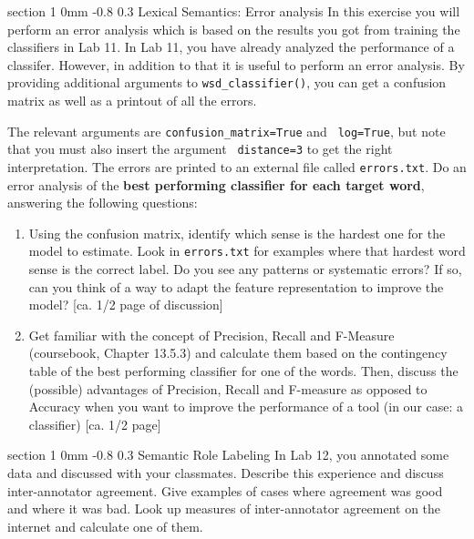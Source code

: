\documentclass[11pt]{article}
\makeatletter
\newcommand{\newsec}[1]{\section{#1}\noindent}
\renewcommand{\section}{\@startsection
{section}%
{1}%
{0mm}%
{-0.8\baselineskip}%
{0.3\baselineskip}%
{\bfseries\large}}%
\makeatother
\begin{document}
\newsec{Lexical Semantics: Error analysis}%
In this exercise you will perform an error analysis which is based on
the results you got from training the classifiers in Lab 11.  In Lab
11, you have already analyzed the performance of a classifer. However,
in addition to that it is useful to perform an error analysis. By
providing additional arguments to {\tt wsd\_classifier()}, you can get
a confusion matrix as well as a printout of all the errors.
\begin{center}
\fbox{
\scalebox{0.55}{

}}
\end{center}
The relevant arguments are {\tt confusion\_matrix=True} and {\tt
  log=True}, but note that you must also insert the argument {\tt
  distance=3} to get the right interpretation. The errors are printed
to an external file called {\tt errors.txt}. Do an error analysis of
the \textbf{best performing classifier for each target word}, answering the
following questions:
\begin{enumerate}
\item Using the confusion matrix, identify which sense is the hardest
  one for the model to estimate. Look in {\tt errors.txt} for examples
  where that hardest word sense is the correct label.  Do you see any
  patterns or systematic errors? If so, can you think of a way to
  adapt the feature representation to improve the model?
  \textcolor{UUred}{[ca. 1/2 page of discussion]}
\item Get familiar with the concept of Precision, Recall and F-Measure (coursebook, Chapter 13.5.3) and calculate them based on the contingency table of the best performing classifier for one of the words. Then, discuss the (possible) advantages of Precision, Recall and F-measure as opposed to Accuracy when you want to improve the performance of a tool (in our case: a classifier) \textcolor{UUred}{[ca. 1/2 page]}
\end{enumerate}


\newsec{Semantic Role Labeling}%
In Lab 12, you annotated some data and discussed with your classmates.
Describe this experience and discuss inter-annotator agreement.  Give
examples of cases where agreement was good and where it was bad.  Look
up measures of inter-annotator agreement on the internet and calculate
one of them.   
\end{document}
